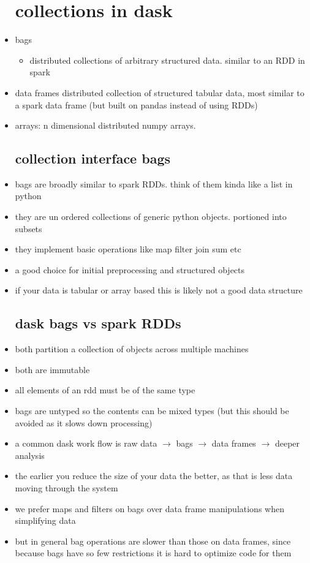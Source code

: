 \documentclass{article}
\begin{document}
\begin{itemize}
\section*{collections in dask}
\item bags 
\begin{itemize}
    \item distributed collections of arbitrary structured data. similar to an RDD in spark 
\end{itemize}
\item data frames distributed collection of structured tabular data, most similar to a spark data frame (but built on pandas instead of using RDDs)
\item arrays: n dimensional distributed numpy arrays. 
\subsection*{collection interface bags}
\item bags are broadly similar to spark RDDs. think of them kinda like a list in python 
\item they are un ordered collections of generic python objects. portioned into subsets 
\item they implement basic operations like map filter join sum etc
\item a good choice for initial preprocessing and structured objects
\item if your data is tabular or array based this is likely not a good data structure 
\subsection*{dask bags vs spark RDDs}
\item  both  partition a collection of objects across multiple machines
\item both are immutable
\item all elements of an rdd must be of the same type 
\item bags are untyped so the contents can be mixed types (but this should be avoided as it slows down processing)
\item a common dask work flow is raw data $\rightarrow$ bags $\rightarrow$ data frames $\rightarrow$ deeper analysis
\item the earlier you reduce the size of your data the better, as that is less data moving through the system 
\item we prefer maps and filters on bags over data frame manipulations when simplifying data 
\item but in general bag operations are slower than those on data frames, since because bags have so few restrictions it is hard to optimize code for them 

\end{itemize}
\end{document}
